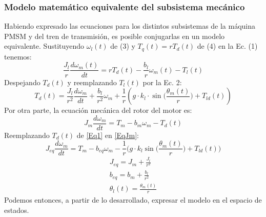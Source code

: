\documentclass[12pt, a4paper,journal, onecolumn, compsoc]{IEEEtran}
\begin{document}
    \subsubsection{Modelo matemático equivalente del subsistema mecánico}
    Habiendo expresado las ecuaciones para los distintos subsistemas de la máquina PMSM y del tren de transmisión, es posible conjugarlas en un modelo equivalente.
    Sustituyendo \(\omega_l(t)\) de (3) y \(T_q(t) = rT_d(t)\) de (4) en la Ec. (1) tenemos:
    \begin{equation}\label{EqAux1}
        \frac{J_l}{r}\frac{d\omega_m(t)}{dt} = rT_d(t)-\frac{b_l}{r}\omega_m(t)-T_l(t)
    \end{equation}
    Despejando \(T_d(t)\) y reemplazando \(T_l(t)\) por la Ec. 2:
    \begin{equation}\label{Eq1}
        T_d(t)=\frac{J_l}{r^2}\frac{d\omega_m}{dt}+\frac{b_l}{r^2}\omega_m+\frac{1}{r}\left(g\cdot k_l\cdot \sin\Big(\frac{\theta_m(t)}{r}\Big)+T_{ld}(t)\right)
    \end{equation}
    Por otra parte, la ecuación mecánica del rotor del motor es:
    \begin{equation}\label{EqJm}
        J_m\frac{d\omega_m}{dt}=T_m-b_m\omega_m-T_d(t)
    \end{equation}
    Reemplazando \(T_d(t)\) de \eqref{Eq1} en  \eqref{EqJm}:
    \begin{equation}
        J_{eq}\frac{d\omega_m}{dt}=T_m-b_{eq}\omega_m-\frac{1}{r}\Big(g\cdot k_l \sin{\Big(\frac{\theta_m(t)}{r}\Big)} + T_{ld}(t)\Big)
    \end{equation}
    \begin{gather}
        J_{eq} = J_m +\frac{J_l}{r^2}\\
        b_{eq} = b_m + \frac{b_l}{r^2}\\
        \theta_l(t)=\frac{\theta_m(t)}{r}
    \end{gather}
    Podemos entonces, a partir de lo desarrollado, expresar el modelo en el espacio de estados.
\end{document}
